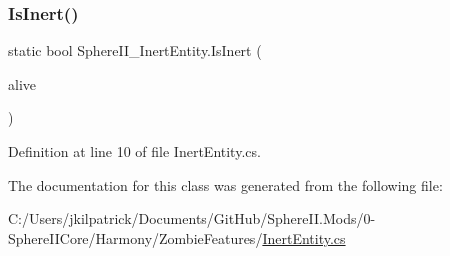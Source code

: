 \subsubsection{\texorpdfstring{IsInert()}{IsInert()}}
{\footnotesize\ttfamily static bool Sphere\+I\+I\+\_\+\+Inert\+Entity.\+Is\+Inert (\begin{DoxyParamCaption}\item[{Entity\+Alive}]{alive }\end{DoxyParamCaption})\hspace{0.3cm}{\ttfamily [static]}}



Definition at line 10 of file Inert\+Entity.\+cs.



The documentation for this class was generated from the following file\+:\begin{DoxyCompactItemize}
\item 
C\+:/\+Users/jkilpatrick/\+Documents/\+Git\+Hub/\+Sphere\+I\+I.\+Mods/0-\/\+Sphere\+I\+I\+Core/\+Harmony/\+Zombie\+Features/\mbox{\hyperlink{_inert_entity_8cs}{Inert\+Entity.\+cs}}\end{DoxyCompactItemize}
